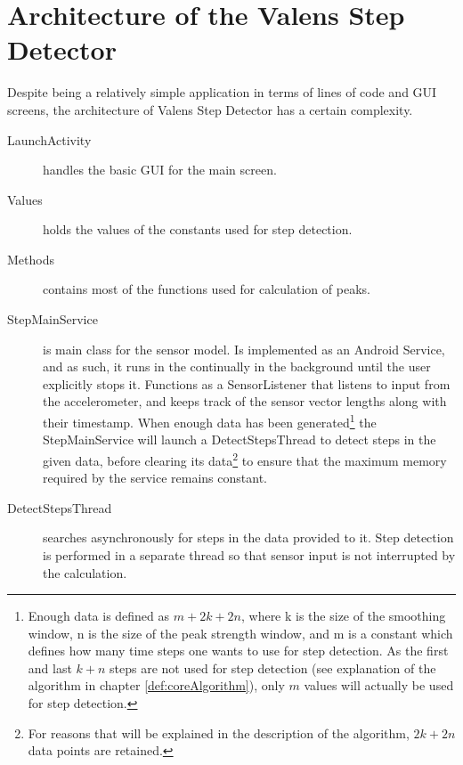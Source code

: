 \section{Architecture of the Valens Step Detector}

Despite being a relatively simple application in terms of lines of code and GUI screens, the architecture of Valens Step Detector has a certain complexity.

\begin{description}

\item[LaunchActivity]
handles the basic GUI for the main screen.

\item[Values]
holds the values of the constants used for step detection.

\item[Methods]
contains most of the functions used for calculation of peaks.

\item[StepMainService]
is main class for the sensor model. Is implemented as an Android Service, and as such, it runs in the continually in the background until the user explicitly stops it. Functions as a SensorListener that listens to input from the accelerometer, and keeps track of the sensor vector lengths along with their timestamp. When enough data has been generated\footnote{Enough data is defined as $m+2k+2n$, where k is the size of the smoothing window, n is the size of the peak strength window, and m is a constant which defines how many time steps one wants to use for step detection. As the first and last $k+n$ steps are not used for step detection (see explanation of the algorithm in chapter \ref{def:coreAlgorithm}), only $m$ values will actually be used for step detection.} the StepMainService will launch a DetectStepsThread to detect steps in the given data, before clearing its data\footnote{For reasons that will be explained in the description of the algorithm, $2k+2n$ data points are retained.} to ensure that the maximum memory required by the service remains constant. 

\item[DetectStepsThread]
searches asynchronously for steps in the data provided to it. Step detection is performed in a separate thread so that sensor input is not interrupted by the calculation.


\end{description}
